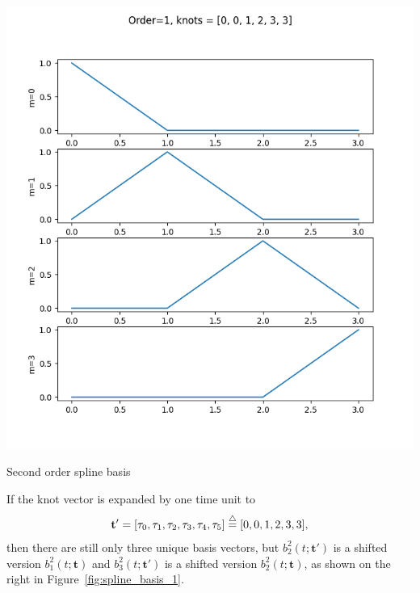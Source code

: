 \begin{marginfigure}[0in]
  	\includegraphics[width=\linewidth]{./chap5_trajectory_planning/figures/spline_basis_1_extra_knot}
  \caption{Second order spline basis}
  \label{fig:spline_basis_1_extra_knot}  
\end{marginfigure}
If the knot vector is expanded by one time unit to
\[
\mathbf{t}' = [\tau_0, \tau_1, \tau_2, \tau_3, \tau_4, \tau_5] \stackrel{\triangle}{=} [0, 0, 1, 2, 3, 3],
\]
then there are still only three unique basis vectors, but 
$b_2^2(t; \mathbf{t}')$ is a shifted version $b_1^2(t; \mathbf{t})$ and $b_3^2(t; \mathbf{t}')$ is a shifted version $b_2^2(t; \mathbf{t})$, as shown on the right in Figure~\ref{fig:spline_basis_1}.

\clearpage


\par{}

